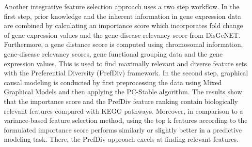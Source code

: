 Another integrative feature selection approach uses a two step workflow. In the first step, prior knowledge and the inherent information in gene expression data are combined by calculating an importance score which incorporates fold change of gene expression values and the gene-disease relevancy score from DisGeNET. Furthermore, a gene distance score is computed using chromosomal information, gene-disease relevancy scores, gene functional grouping data and the gene expression values. This is used to find maximally relevant and diverse feature sets with the Preferential Diversity (PrefDiv) framework. In the second step, graphical causal modeling is conducted by first preprocessing the data using Mixed Graphical Models and then applying the PC-Stable algorithm. The results show that the importance score and the PrefDiv feature ranking contain biologically relevant features compared with KEGG pathways. Moreover, in comparison to a variance-based feature selection method, using the top k features according to the formulated importance score performs similarly or slightly better in a predictive modeling task. There, the PrefDiv approach excels at finding relevant features.
\cite{raghu2017integrated}
